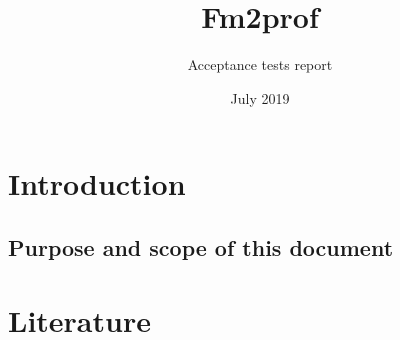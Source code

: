 \documentclass[signature]{deltares_report}
\begin{document}
\pagestyle{empty}
\cleardoublepage
%

\newcommand{\ProgramName}{Fm2prof\xspace}

\title{\ProgramName}
\subtitle{Acceptance tests report}
\classification{-}

\date{July 2019}


\summary{}

\revieweri{}
\approvali{}

\disclaimer{}

\deltarestitle


\chapter{Introduction} 
\label{chapterIntroduction}

\section{Purpose and scope of this document} \label{sec:PurposeAndScope}





\chapter{Literature}  \label{chapterLiterature}

\pagestyle{empty}
\mbox{}

\end{document}
